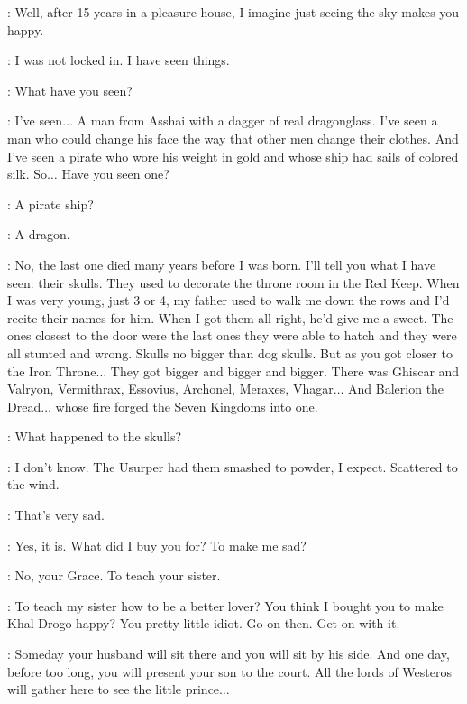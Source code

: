 \VISERYS: Well, after 15 years in a pleasure house, I imagine just seeing the sky makes you happy. 

\DOREAH: I was not locked in. I have seen things. 

\VISERYS: What have you seen? 

\DOREAH: I've seen$\ldots$ A man from Asshai with a dagger of real dragonglass. I've seen a man who could change his face the way that other men change their clothes. And I've seen a pirate who wore his weight in gold and whose ship had sails of colored silk. So$\ldots$ Have you seen one? 

\VISERYS: A pirate ship? 

\DOREAH: A dragon. 

\VISERYS: No, the last one died many years before I was born. I'll tell you what I have seen: their skulls. They used to decorate the throne room in the Red Keep.  When I was very young, just 3 or 4, my father used to walk me down the rows and I'd recite their names for him. When I got them all right, he'd give me a sweet. The ones closest to the door were the last ones they were able to hatch and they were all stunted and wrong. Skulls no bigger than dog skulls. But as you got closer to the Iron Throne$\ldots$ They got bigger and bigger and bigger. There was Ghiscar and Valryon, Vermithrax, Essovius, Archonel, Meraxes, Vhagar$\ldots$ And Balerion the Dread$\ldots$ whose fire forged the Seven Kingdoms into one. 

\DOREAH: What happened to the skulls? 

\VISERYS: I don't know. The Usurper had them smashed to powder, I expect. Scattered to the wind. 

\DOREAH: That's very sad. 

\VISERYS: Yes, it is. What did I buy you for? To make me sad? 

\DOREAH: No, your Grace. To teach your sister. 

\VISERYS: To teach my sister how to be a better lover? You think I bought you to make Khal Drogo happy? You pretty little idiot. Go on then. Get on with it. 

\scene



\SEPTAMORDANE: Someday your husband will sit there and you will sit by his side. And one day, before too long, you will present your son to the court. All the lords of Westeros will gather here to see the little prince$\ldots$ 


